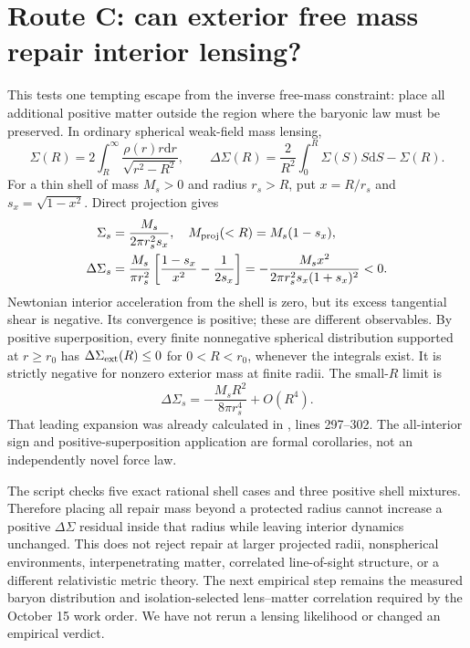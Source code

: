\documentclass[11pt]{article}
\newcommand{\dd}{\mathrm d}
\begin{document}
\section{Route C: can exterior free mass repair interior lensing?}
This tests one tempting escape from the inverse free-mass constraint:
place all additional positive matter outside the region where the baryonic
law must be preserved. In ordinary spherical weak-field mass lensing,
\begin{equation}
 \Sigma(R)=2\int_R^\infty\frac{\rho(r)r\dd r}{\sqrt{r^2-R^2}},\qquad
 \Delta\Sigma(R)=\frac2{R^2}\int_0^R\Sigma(S)S\dd S-\Sigma(R).
\end{equation}
For a thin shell of mass $M_s>0$ and radius $r_s>R$, put
$x=R/r_s$ and $s_x=\sqrt{1-x^2}$. Direct projection gives
\begin{align}
 \Sigma_s&=\frac{M_s}{2\pi r_s^2s_x},\quad
 M_{\rm proj}(<R)=M_s(1-s_x),\\
 \Delta\Sigma_s
 &=\frac{M_s}{\pi r_s^2}
 \left[\frac{1-s_x}{x^2}-\frac1{2s_x}\right]
 =-\frac{M_s x^2}{2\pi r_s^2s_x(1+s_x)^2}<0.
\end{align}
Newtonian interior acceleration from the shell is zero, but its excess
tangential shear is negative. Its convergence is positive; these are
different observables. By positive superposition, every finite nonnegative
spherical distribution supported at $r\ge r_0$ has
$\Delta\Sigma_{\rm ext}(R)\le0$ for $0<R<r_0$, whenever the integrals exist.
It is strictly negative for nonzero exterior mass at finite radii.
The small-$R$ limit is
\begin{equation}
 \Delta\Sigma_s=-\frac{M_sR^2}{8\pi r_s^4}+O(R^4).
\end{equation}
That leading expansion was already calculated in
, lines 297--302.
The all-interior sign and positive-superposition application are formal
corollaries, not an independently novel force law.

The script checks five exact rational shell cases and three positive shell
mixtures. Therefore placing all repair mass beyond a protected radius cannot
increase a positive $\Delta\Sigma$ residual inside that radius while leaving
interior dynamics unchanged. This does not reject repair at larger projected
radii, nonspherical environments, interpenetrating matter, correlated
line-of-sight structure, or a different relativistic metric theory.
The next empirical step remains the measured baryon distribution and
isolation-selected lens--matter correlation required by the October 15 work
order. We have not rerun a lensing likelihood or changed an empirical verdict.
\end{document}
